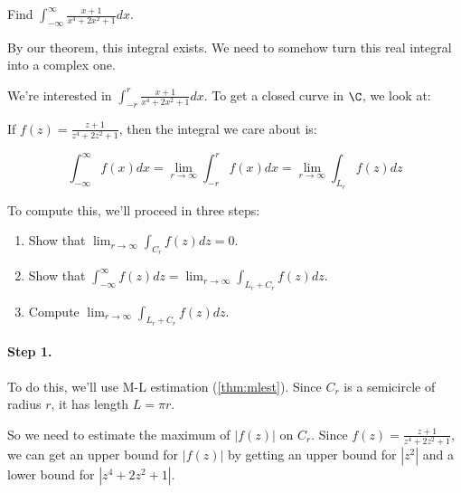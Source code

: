 \begin{ex}{}{} Find $\int_{-\infty}^\infty \frac{x + 1}{x^4+ 2x^2 + 1}dx$.

By our theorem, this integral exists. We need to somehow turn this real integral into a complex one.

We're interested in $\int_{-r}^r \frac{x+1}{x^4 + 2x^2 + 1}dx$. To get a closed curve in $\C$, we look at:

\begin{center}
\end{center}

If $f(z) = \frac{z+1}{z^4 + 2z^2 + 1}$, then the integral we care about is:

$$\int_{-\infty}^\infty f(x)dx = \lim_{r\rightarrow \infty} \int_{-r}^r f(x)dx = \lim_{r\rightarrow \infty} \int_{L_r}f(z)dz$$

To compute this, we'll proceed in three steps:

\begin{enumerate}
\item Show that $\lim_{r\rightarrow \infty} \int_{C_r} f(z)dz = 0$.
\item Show that $\int_{-\infty}^\infty f(z)dz = \lim_{r\rightarrow \infty} \int_{L_r + C_r} f(z)dz$.
\item Compute $\lim_{r\rightarrow \infty} \int_{L_r + C_r} f(z)dz$.
\end{enumerate}

\paragraph{Step 1.} To do this, we'll use M-L estimation (\ref{thm:mlest}). Since $C_r$ is a semicircle of radius $r$, it has length $L = \pi r$.

So we need to estimate the maximum of $|f(z)|$ on $C_r$. Since $f(z) = \frac{z+1}{z^4 + 2z^2 + 1}$, we can get an upper bound for $|f(z)|$ by getting an upper bound for $|z^2|$ and a lower bound for $|z^4 + 2z^2 + 1|$.


\end{ex}
